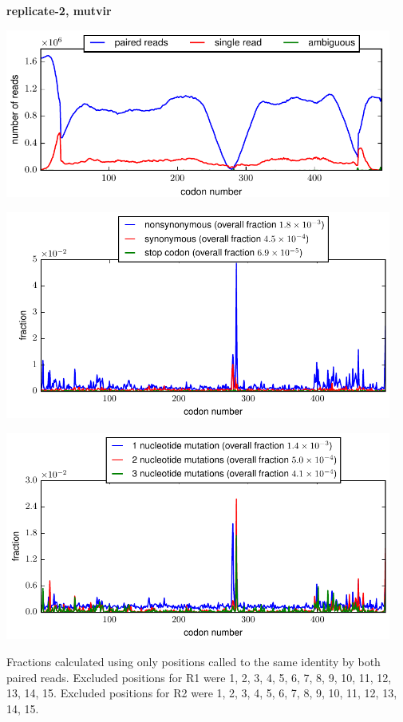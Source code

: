 \documentclass[10pt,letterpaper]{article}
\begin{document}
\centerline{\Large \bf replicate-2, mutvir}
\vspace{0.1in}

\centerline{\includegraphics[width=5in]{replicate-2-mutvir_codondepth.pdf}}
\vspace{0.1in}

\centerline{\includegraphics[width=5in]{replicate-2-mutvir_syn-ns-dist.pdf}}
\vspace{0.1in}

\centerline{\includegraphics[width=5in]{replicate-2-mutvir_nmutspercodon-dist.pdf}}
\vspace{0.1in}

Fractions calculated using only positions called to the same identity by both paired reads.  Excluded positions for R1 were 1, 2, 3, 4, 5, 6, 7, 8, 9, 10, 11, 12, 13, 14, 15. 
 Excluded positions for R2 were 1, 2, 3, 4, 5, 6, 7, 8, 9, 10, 11, 12, 13, 14, 15. 
\end{document}
